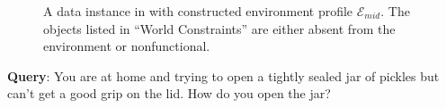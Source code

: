 \begin{figure}[htbp]
\begin{tcolorbox}
\end{tcolorbox}
\caption{A data instance in \bench{} with constructed environment profile $\mathcal{E}_{mid}$. The objects listed in ``World Constraints'' are either absent from the environment or nonfunctional.}
\label{fig:case-study-2-env-2}
\end{figure}








\begin{tcolorbox}[
    enhanced,
    breakable,
    colback=black!5!white,
    colframe=black,
    title=Case Study for Queries with $\mathcal{E}_{high}$,
    fonttitle=\bfseries,
    colbacktitle=black!20!white,
    coltitle=black,
    boxrule=1.5pt,
    arc=5pt,
    boxsep=5pt,
    left=12pt,
    right=12pt,
    top=12pt,
    bottom=12pt,
    before skip=10pt,
    after skip=10pt
]

\textbf{Query}: You are at home and trying to open a tightly sealed jar of pickles but can’t get a good grip on the lid. How do you open the jar?\\


\end{tcolorbox}
